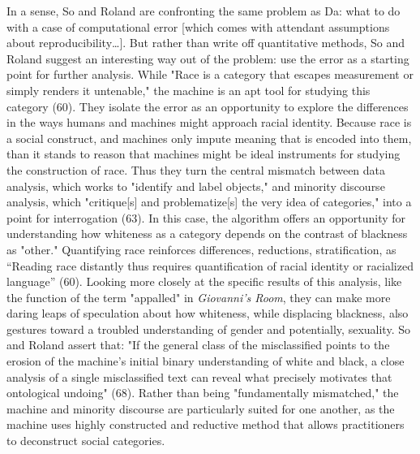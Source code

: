 \documentclass[11pt]{article}
\begin{document}
In a sense, So and Roland are confronting the same problem as Da: what
to do with a case of computational error [which comes with attendant
assumptions about reproducibility\ldots{}]. But rather than write off
quantitative methods, So and Roland suggest an interesting way out of
the problem: use the error as a starting point for further
analysis. While "Race is a category that escapes measurement or simply
renders it untenable," the machine is an apt tool for studying this
category (60). They isolate the error as an opportunity to explore the
differences in the ways humans and machines might approach racial
identity. Because race is a social construct, and machines only impute
meaning that is encoded into them, than it stands to reason that
machines might be ideal instruments for studying the construction of
race. Thus they turn the central mismatch between data analysis, which
works to "identify and label objects," and minority discourse
analysis, which "critique[s] and problematize[s] the very idea of
categories," into a point for interrogation (63). In this case, the
algorithm offers an opportunity for understanding how whiteness as a
category depends on the contrast of blackness as "other." Quantifying
race reinforces differences, reductions, stratification, as “Reading
race distantly thus requires quantification of racial identity or
racialized language” (60). Looking more closely at the specific
results of this analysis, like the function of the term "appalled" in
\emph{Giovanni's Room}, they can make more daring leaps of speculation
about how whiteness, while displacing blackness, also gestures toward
a troubled understanding of gender and potentially, sexuality. So and
Roland assert that: "If the general class of the misclassified points
to the erosion of the machine's initial binary understanding of white
and black, a close analysis of a single misclassified text can reveal
what precisely motivates that ontological undoing" (68). Rather than
being "fundamentally mismatched," the machine and minority discourse
are particularly suited for one another, as the machine uses highly
constructed and reductive method that allows practitioners to
deconstruct social categories.
\end{document}
